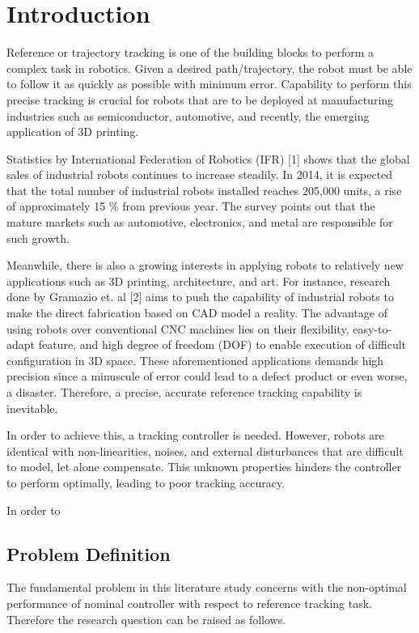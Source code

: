 %
\chapter{Introduction} \label{chap::intro}
Reference or trajectory tracking is one of the building blocks to perform a complex task in robotics. Given a desired path/trajectory, the robot must be able to follow it as quickly as possible with minimum error. Capability to perform this precise tracking is crucial for robots that are to be deployed at manufacturing industries such as semiconductor, automotive, and recently, the emerging application of 3D printing. 

Statistics by International Federation of Robotics (IFR) [1] shows that the global sales of industrial robots continues to increase steadily. In 2014, it is expected that the total number of industrial robots installed reaches 205,000 units, a rise of approximately 15 \% from previous year. The survey points out that the mature markets such as automotive, electronics, and metal are responsible for such growth. 

Meanwhile, there is also a growing interests in applying robots to relatively new applications such as 3D printing, architecture, and art. For instance, research done by Gramazio et. al [2] aims to push the capability of industrial robots to make the direct fabrication based on CAD model a reality. The advantage of using robots over conventional CNC machines lies on their flexibility, easy-to-adapt feature, and high degree of freedom (DOF) to enable execution of difficult configuration in 3D space. These aforementioned applications demands high precision since a minuscule of error could lead to a defect product or even worse, a disaster. Therefore, a precise, accurate reference tracking capability is inevitable.

In order to achieve this, a tracking controller is needed. However, robots are identical with non-linearities, noises, and external disturbances that are difficult to model, let alone compensate. This unknown properties hinders the controller to perform optimally, leading to poor tracking accuracy.

In order to 



\section{Problem Definition}
The fundamental problem in this literature study concerns with the non-optimal performance of nominal controller with respect to reference tracking task. Therefore the research question can be raised as follows.

